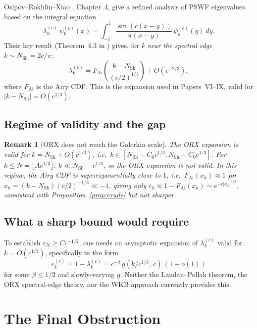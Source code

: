 \documentclass[12pt,a4paper]{article}
\newtheorem{remark}[theorem]{Remark}
\newcommand{\lam}[1]{\lambda_{#1}^{(c)}}
\newcommand{\pswf}[1]{\psi_{#1}^{(c)}}
\begin{document}
Osipov--Rokhlin--Xiao \cite{ORX2013}, Chapter~4,
give a refined analysis of PSWF eigenvalues based on
the integral equation
\[
  \lambda_k^{(c)}\,\pswf{k}(x)
  = \int_{-1}^{1} \frac{\sin(c(x-y))}{\pi(x-y)}\,
  \pswf{k}(y)\,dy.
\]
Their key result (Theorem~4.3 in \cite{ORX2013})
gives, for $k$ \emph{near the spectral edge}
$k \sim N_{\mathrm{Sh}} = 2c/\pi$:
\[
  \lam{k} = F_{\mathrm{Ai}}\!\left(
  \frac{k - N_{\mathrm{Sh}}}{(c/2)^{1/3}}\right)
  + O(c^{-2/3}),
\]
where $F_{\mathrm{Ai}}$ is the Airy CDF.
This is the expansion used in Papers~VI--IX,
valid for $|k - N_{\mathrm{Sh}}| = O(c^{1/3})$.

\subsection{Regime of validity and the gap}

\begin{remark}[ORX does not reach the Galerkin scale]
The ORX expansion is valid for
$k = N_{\mathrm{Sh}} + O(c^{1/3})$,
i.e.\ $k \in [N_{\mathrm{Sh}} - C_0 c^{1/3},
N_{\mathrm{Sh}} + C_0 c^{1/3}]$.
For $k \leq N = \lfloor Ac^{1/3}\rfloor$:
$k \ll N_{\mathrm{Sh}} - c^{1/3}$,
so the ORX expansion is \emph{not valid}.
In this regime, the Airy CDF is superexponentially
close to $1$, i.e.\ $F_{\mathrm{Ai}}(x_k) \approx 1$
for $x_k = (k-N_{\mathrm{Sh}})(c/2)^{-1/3} \ll -1$,
giving only $\varepsilon_k \approx 1 - F_{\mathrm{Ai}}(x_k)
\sim e^{-c|x_k|^{3/2}}$,
consistent with Proposition~\ref{prop:crude}
but not sharper.
\end{remark}

\subsection{What a sharp bound would require}

To establish $\varepsilon_N \geq Cc^{-1/2}$, one needs
an asymptotic expansion of $\lam{k}$ valid for
$k = O(c^{1/3})$, specifically in the form
\[
  \varepsilon_k^{(c)} = 1 - \lam{k}
  = c^{-\beta}\,g(k/c^{1/3},\, c)\,(1 + o(1))
\]
for some $\beta \leq 1/2$ and slowly-varying $g$.
Neither the Landau--Pollak theorem,
the ORX spectral-edge theory,
nor the WKB approach currently provides this.

\section{The Final Obstruction}
\label{sec:obstruction}
\end{document}
